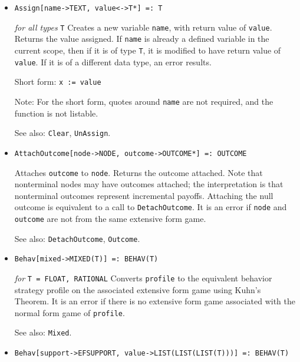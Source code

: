 \begin{itemize}
\item{} 
\protect \large \begin{verbatim}
Assign[name->TEXT, value<->T*] =: T
\end{verbatim} \normalsize

{\it for all types} {\tt T} 
\bd 
Creates a new variable \verb+name+, with return value of \verb+value+.
Returns the value assigned.  If \verb+name+ is already a defined
variable in the current scope, then if it is of type \verb+T+, it is
modified to have return value of \verb+value+.  If it is of a
different data type, an error results.
 
\item [Short form:] \verb+x := value+
\item [Note:] For the short form, quotes around \verb+name+ are not
required, and the function is not listable.
\item [See also:] \verb+Clear+, \verb+UnAssign+.
\ed

\item{}
\protect \large \begin{verbatim} 
AttachOutcome[node->NODE, outcome->OUTCOME*] =: OUTCOME
\end{verbatim}\normalsize

\bd
Attaches \verb+outcome+ to \verb+node+.  Returns the outcome attached.
Note that nonterminal nodes may have outcomes attached; the interpretation
is that nonterminal outcomes represent incremental payoffs.  Attaching
the null outcome is equivalent to a call to \verb+DetachOutcome+.  It is
an error if \verb+node+ and \verb+outcome+ are not from the same
extensive form game.
\item [See also:] \verb+DetachOutcome+, \verb+Outcome+.
\ed


\item{}
\protect \large \begin{verbatim}
Behav[mixed->MIXED(T)] =: BEHAV(T)
\end{verbatim}\normalsize

{\it for} {\tt T = FLOAT, RATIONAL}
\bd
Converts \verb+profile+ to the equivalent behavior strategy profile on the
associated extensive form game using Kuhn's Theorem.  It is an error
if there is no extensive form game associated with the normal form game
of \verb+profile+.
\item [See also:] \verb+Mixed+.
\ed

\item{}
\protect \large \begin{verbatim}
Behav[support->EFSUPPORT, value->LIST(LIST(LIST(T)))] =: BEHAV(T)
\end{verbatim}\normalsize


\end{itemize}
